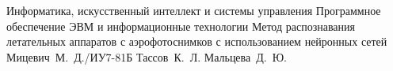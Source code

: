 \documentclass{bmstu}
\begin{document}
\makethesistitle
{Информатика, искусственный интеллект и системы управления} %
{Программное обеспечение ЭВМ и информационные технологии} %
{Метод распознавания летательных аппаратов с аэрофотоснимков с использованием нейронных сетей} %
{Мицевич~М.~Д./ИУ7-81Б} %
{Тассов~К.~Л.} %
{} %
{Мальцева~Д.~Ю.} %




\maketableofcontents











\makebibliography


\end{document}

